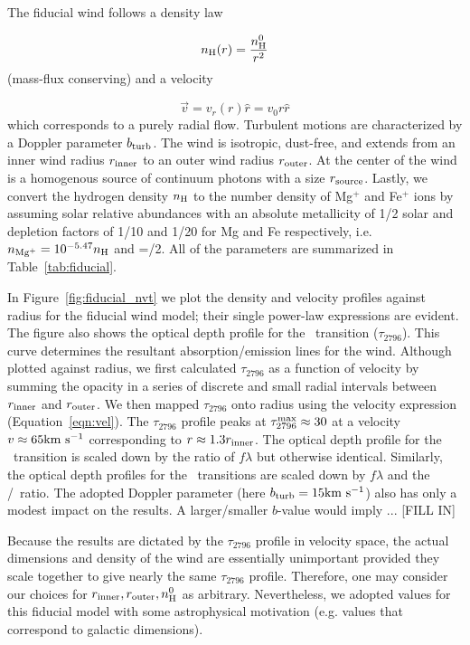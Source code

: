 \documentclass[12pt,preprint]{aastex}
\begin{document}
The fiducial wind follows a density law

\begin{equation}
n_{\rm H} (r) = \frac{n^0_{\rm H}}{r^2}
\end{equation}
(mass-flux conserving) and a velocity 

\begin{equation}
\vec v = v_r (r) \hat r = v_0 r \hat r
\label{eqn:vel}
\end{equation}
which corresponds to a purely radial flow.  Turbulent motions are
characterized by a Doppler parameter $b_{\rm turb}$.  
The wind is isotropic, dust-free, and extends from an inner wind
radius $r_{\rm inner}$ to an outer wind radius $r_{\rm outer}$.  At
the center of the wind 
is a homogenous source of continuum photons with a size $r_{\rm source}$.  Lastly,
we convert the hydrogen density $n_{\rm H}$ to the number density of
Mg$^+$ and Fe$^+$ ions by assuming solar relative abundances with an
absolute metallicity of 1/2 solar and depletion factors of 1/10 and
1/20 for Mg and Fe respectively, i.e.\  $n_{\rm Mg^+} = 10^{-5.47} n_{\rm H}$ 
and \nfe=\nmg/2.   
All of the parameters are summarized in Table~\ref{tab:fiducial}.  

In Figure~\ref{fig:fiducial_nvt} we plot the density and velocity
profiles against radius for the fiducial wind model;  
their single power-law expressions are evident.  The figure also
shows the optical depth profile for the \mgiia\ transition ($\tau_{2796}$).
This curve determines the resultant absorption/emission lines
for the wind.  
Although plotted against radius, we first calculated $\tau_{2796}$ 
as a function of velocity by summing the opacity in a series of
discrete and small radial intervals
between $r_{\rm inner}$  and $r_{\rm outer}$.   We then mapped
$\tau_{2796}$ onto radius using the velocity expression
(Equation~\ref{eqn:vel}). 
The $\tau_{2796}$ profile peaks at $\tau_{2796}^{\rm max} \approx 30$
at a velocity $v \approx 65 {\rm km~s^{-1}}$ corresponding to $r \approx 1.3
r_{\rm inner}$.  The optical depth profile for the \mgiib\ transition
is scaled down by the ratio of $f\lambda$ but otherwise identical.  Similarly,
the optical depth profiles for the \feiid\ transitions are
scaled down by $f \lambda$ and the \nfe/\nmg\ ratio.  
The adopted Doppler parameter
(here $b_{\rm turb} = 15 {\rm km~s^{-1}}$) also has only a modest impact on the results.
A larger/smaller $b$-value would imply ... [FILL IN]

Because the results are dictated by the $\tau_{2796}$ profile in
velocity space, the actual dimensions and density of the wind are
essentially unimportant provided they scale together to give nearly the same
$\tau_{2796}$ profile.  Therefore, one may consider our choices for
$r_{\rm inner}, r_{\rm outer}, n_{\rm H}^0$ as arbitrary.
Nevertheless, we adopted values for this fiducial model with
some astrophysical motivation (e.g. values that correspond to
galactic dimensions).
\end{document}
